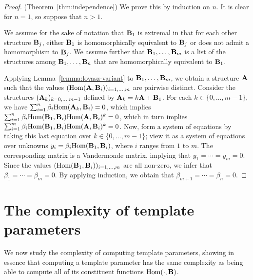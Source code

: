 \documentclass[11pt]{article}
\begin{document}
\begin{proof} (Theorem~\ref{thm:independence})
We prove this by induction on $n$.  It is clear for $n = 1$,
so suppose that $n > 1$.

We assume for the sake of notation that $\mathbf{B}_1$
is extremal in that for each other structure $\mathbf{B}_j$,
either $\mathbf{B}_1$ is homomorphically equivalent to $\mathbf{B}_j$
or does not admit a homomorphism to $\mathbf{B}_j$.
We assume further that $\mathbf{B}_1, \ldots, \mathbf{B}_m$
is a list of the structures among $\mathbf{B}_1, \ldots, \mathbf{B}_n$
that are homomorphically equivalent to $\mathbf{B}_1$.

Applying Lemma~\ref{lemma:lovasz-variant}
to $\mathbf{B}_1, \ldots, \mathbf{B}_m$, 
we obtain a structure $\mathbf{A}$ such that
the values $(\mathrm{Hom}(\mathbf{A},\mathbf{B}_i))_{i=1,\ldots,m}$
are pairwise distinct.
Consider the structures $(\mathbf{A}_{k})_{k=0,\ldots,m-1}$
defined by $\mathbf{A}_k = k \mathbf{A} + \mathbf{B}_1$.
For each $k \in \{ 0, \ldots, m-1 \}$,
we have
$\sum_{i=1}^n \beta_i \mathrm{Hom}(\mathbf{A}_k,\mathbf{B}_i) = 0$,
which implies 
$\sum_{i=1}^n \beta_i \mathrm{Hom}(\mathbf{B}_1,\mathbf{B}_i) \mathrm{Hom}(\mathbf{A},\mathbf{B}_i)^k = 0$,
which in turn implies 
$\sum_{i=1}^m \beta_i \mathrm{Hom}(\mathbf{B}_1,\mathbf{B}_i) \mathrm{Hom}(\mathbf{A},\mathbf{B}_i)^k = 0$.
Now, form a system of equations by taking this last equation 
over $k \in \{ 0, \ldots, m-1 \}$;
view it as a system of equations over unknowns 
$y_i = \beta_i \mathrm{Hom}(\mathbf{B}_1,\mathbf{B}_i)$, where $i$ ranges from $1$ to $m$.
The corresponding matrix is a Vandermonde matrix,
implying that $y_1 = \cdots = y_m = 0$.
Since the values $(\mathrm{Hom}(\mathbf{B}_1,\mathbf{B}_i))_{i=1,\ldots,m}$
are all non-zero, we infer that
$\beta_1 = \cdots = \beta_m = 0$.
By applying induction, we obtain that
$\beta_{m+1} = \cdots = \beta_n = 0$.
\end{proof}





\section{The complexity of template parameters}

We now study the complexity of computing template parameters,
showing in essence that computing a template parameter 
has the same complexity as being able to compute
all of its constituent functions $\mathrm{Hom}(\cdot,\mathbf{B})$.
\end{document}
